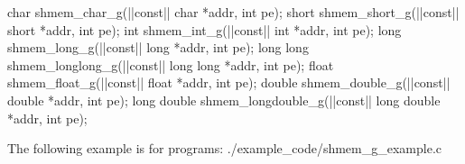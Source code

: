 
\begin{apidefinition}

\begin{Csynopsis}
char shmem_char_g(|\aftergroup{}|const|\aftergroup\prevcolor| char *addr, int pe);
short shmem_short_g(|\aftergroup{}|const|\aftergroup\prevcolor| short *addr, int pe);
int shmem_int_g(|\aftergroup{}|const|\aftergroup\prevcolor| int *addr, int pe);
long shmem_long_g(|\aftergroup{}|const|\aftergroup\prevcolor| long *addr, int pe);
long long  shmem_longlong_g(|\aftergroup{}|const|\aftergroup\prevcolor| long long *addr, int pe);
float shmem_float_g(|\aftergroup{}|const|\aftergroup\prevcolor| float *addr, int pe);
double shmem_double_g(|\aftergroup{}|const|\aftergroup\prevcolor| double *addr, int pe);
long double shmem_longdouble_g(|\aftergroup{}|const|\aftergroup\prevcolor| long double *addr, int pe);
\end{Csynopsis}

\begin{apiarguments}
\end{apiarguments}




\begin{apiexamples}

\apicexample
    {The following  example is for \CorCpp{} programs:}
    {./example_code/shmem_g_example.c}
    {}
\end{apiexamples}

\end{apidefinition}
